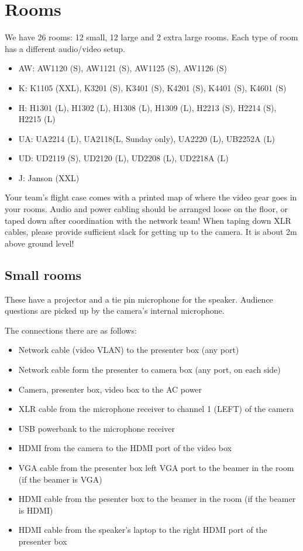 \documentclass{article}
\begin{document}
\section{Rooms}
We have 26 rooms: 12 small, 12 large and 2 extra large rooms. Each type of room has a different audio/video setup.
\begin{itemize}
  \item AW: AW1120 (S), AW1121 (S), AW1125 (S), AW1126 (S)
  \item K: K1105 (XXL), K3201 (S), K3401 (S), K4201 (S), K4401 (S), K4601 (S)
  \item H: H1301 (L), H1302 (L), H1308 (L), H1309 (L), H2213 (S), H2214 (S), H2215 (L)
  \item UA: UA2214 (L), UA2118(L, Sunday only), UA2220 (L), UB2252A (L)
  \item UD: UD2119 (S), UD2120 (L), UD2208 (L), UD2218A (L)
  \item J: Janson (XXL)
\end{itemize}

Your team's flight case comes with a printed map of where the video gear goes in your rooms. Audio and power cabling should be arranged loose on the floor, or taped down after coordination with the network team! When taping down XLR cables, please provide sufficient slack for getting up to the camera. It is about 2m above ground level!

\subsection{Small rooms}
These have a projector and a tie pin microphone for the speaker. Audience questions are picked up by the camera's internal microphone.

The connections there are as follows:

\begin{itemize}
  \item Network cable (video VLAN) to the presenter box (any port)
  \item Network cable form the presenter to camera box (any port, on each side)
  \item Camera, presenter box, video box to the AC power
  \item XLR cable from the microphone receiver to channel 1 (LEFT) of the camera
  \item USB powerbank to the microphone receiver
  \item HDMI from the camera to the HDMI port of the video box
  \item VGA cable from the presenter box left VGA port to the beamer in the room (if the beamer is VGA)
  \item HDMI cable from the pesenter box to the beamer in the room (if the beamer is HDMI)
  \item HDMI cable from the speaker's laptop to the right HDMI port of the presenter box
\end{itemize}
\end{document}
